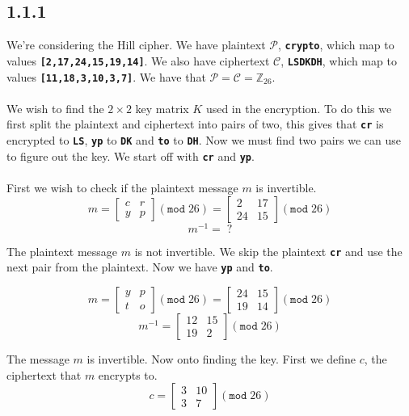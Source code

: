\documentclass[11pt]{report}
\begin{document}
\subsection*{1.1.1}
We're considering the Hill cipher. We have plaintext $\mathcal{P}$, {\tt\bfseries crypto}, which map to values {\tt\bfseries [2,17,24,15,19,14]}. We also have ciphertext $\mathcal{C}$, {\tt\bfseries LSDKDH}, which map to values {\tt\bfseries [11,18,3,10,3,7]}. We have that $\mathcal{P} = \mathcal{C} = \mathbb{Z}_{26}$.
\\
\\
We wish to find the $2 \times 2$ key matrix $K$ used in the encryption. To do this we first split the plaintext and ciphertext into pairs of two, this gives that {\tt\bfseries cr} is encrypted to {\tt\bfseries LS}, {\tt\bfseries yp} to {\tt\bfseries DK} and {\tt\bfseries to} to {\tt\bfseries DH}. Now we must find two pairs we can use to figure out the key. We start off with {\tt\bfseries cr} and {\tt\bfseries yp}.\\
\\
First we wish to check if the plaintext message $m$ is invertible.
$$m = \begin{bmatrix}
       c & r\\
       y & p
	\end{bmatrix} (\mathtt{mod}\;26) = \begin{bmatrix}
       2 & 17\\
       24 & 15
	\end{bmatrix} (\mathtt{mod}\;26)$$
$$m^{-1} =\;?$$

The plaintext message $m$ is not invertible. We skip the plaintext {\tt\bfseries cr} and use the next pair from the plaintext. Now we have {\tt\bfseries yp} and {\tt\bfseries to}.

$$m = \begin{bmatrix}
       	y & p\\
     	t & o
	\end{bmatrix} (\mathtt{mod}\;26) = \begin{bmatrix}
		24 & 15\\
		19 & 14
	\end{bmatrix} (\mathtt{mod}\;26)$$
$$m^{-1} = \begin{bmatrix}
		12 & 15\\
		19 & 2
	\end{bmatrix} (\mathtt{mod}\;26)$$

The message $m$ is invertible. Now onto finding the key. First we define $c$, the ciphertext that $m$ encrypts to.
$$c = \begin{bmatrix}
		3 & 10\\
		3 & 7
	\end{bmatrix} (\mathtt{mod}\;26)$$
	
\end{document}
